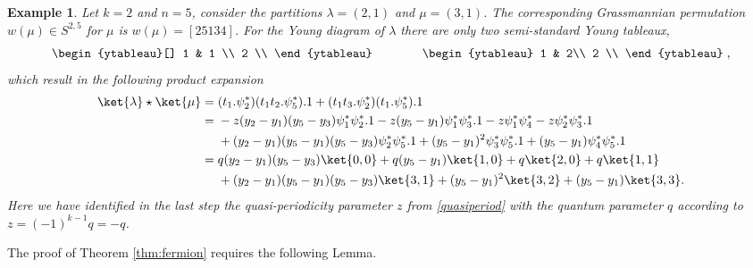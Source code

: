 \documentclass[12pt]{amsart}
\newtheorem{example}[prop]{Example}
\numberwithin{equation}{section}
\numberwithin{figure}{section}
\begin{document}
\begin{example}\label{exampleproduct} \rm
    Let $k = 2$ and $n = 5$, consider the partitions $\lambda = (2 , 1)$ and $\mu = (3,1)$. The corresponding Grassmannian permutation $w(\mu)\in S^{2,5}$ for $\mu$ is $w(\mu)=[25134]$. For the Young diagram of $\lambda$ there are only two semi-standard Young tableaux,
    \[
    \begin{ytableau}[]
    1 & 1  \\ 2 \\   
    \end{ytableau}  \qquad \qquad
    \begin{ytableau}
        1 & 2\\
        2 \\
    \end{ytableau}\;,
    \]
    which result in the following product expansion
    \begin{align*}
        \ket{\lambda} \star \ket{\mu } =\;& (t_1. \psi^*_2) (t_1 t_2. \psi^*_5).1 + (t_1 t_3. \psi_2^*) (t_1. \psi^*_5).1 \\
        =\;& -z (y_2 - y_1)(y_5 - y_3) \psi^*_1 \psi^*_2.1 - z (y_5 - y_1)\psi^*_1 \psi^*_3.1 - z \psi^*_1 \psi^*_4 - z \psi^*_2 \psi^*_3.1 \\
        &+ (y_2 - y_1)(y_5 - y_1)(y_5 - y_3) \psi^*_2 \psi^*_5.1 
        + (y_5 - y_1)^2 \psi^*_3 \psi^*_5.1 + (y_5 - y_1) \psi^*_4 \psi^*_5.1\\
        =\;& q (y_2 - y_1)(y_5 - y_3) \ket{0,0} + q (y_5 - y_1)\ket{1,0} + q \ket{2,0} + q \ket{1,1} \\
        &+ (y_2 - y_1)(y_5 - y_1)(y_5 - y_3) \ket{3,1} 
        + (y_5 - y_1)^2 \ket{3,2} + (y_5 - y_1) \ket{3,3}.
    \end{align*}
    Here we have identified in the last step the quasi-periodicity parameter $z$ from \eqref{quasiperiod} with the quantum parameter $q$ according to $z=(-1)^{k-1}q=-q$.
    \end{example}
The proof of Theorem \ref{thm:fermion} requires the following Lemma.
\end{document}
